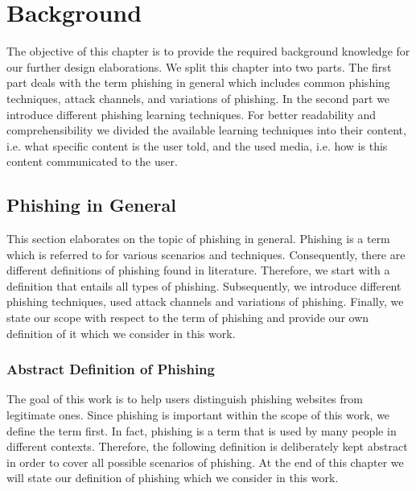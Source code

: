 \section{Background}
\label{s:background}
The objective of this chapter is to provide the required background knowledge for our further design elaborations. 
We split this chapter into two parts.
The first part deals with the term phishing in general which includes common phishing techniques, attack channels, and variations of phishing.
In the second part we introduce different phishing learning techniques.
For better readability and comprehensibility we divided the available learning techniques into their content, i.e. what specific content is the user told, and the used media, i.e. how is this content communicated to the user.


\subsection{Phishing in General}
\label{s:phishing_general}
This section elaborates on the topic of phishing in general.
Phishing is a term which is referred to for various scenarios and techniques.
Consequently, there are different definitions of phishing found in literature.
Therefore, we start with a definition that entails all types of phishing.
Subsequently, we introduce different phishing techniques, used attack channels and variations of phishing.
Finally, we state our scope with respect to the term of phishing and provide our own definition of it which we consider in this work.
\subsubsection{Abstract Definition of Phishing}
\label{s:phishing_def}
The goal of this work is to help users distinguish phishing websites from legitimate ones. 
 Since phishing is important within the scope of this work, we define the term first. In fact, phishing is a term that is used by many people in different contexts. Therefore, the following definition is deliberately kept abstract in order to cover all possible scenarios of phishing. At the end of this chapter we will state our definition of phishing which we consider in this work.

